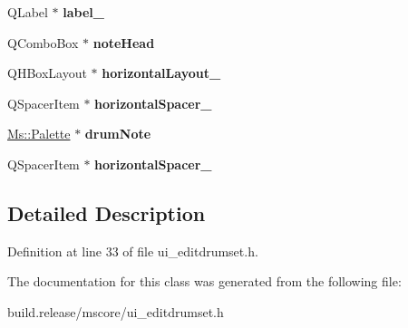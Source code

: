 \begin{DoxyCompactItemize}
Q\+Label $\ast$ {\bfseries label\+\_}
\item 
\mbox{\label{class_ui___edit_drumset_base_a59a7953e60b33395b39d446f1b00ff71}} 
Q\+Combo\+Box $\ast$ {\bfseries note\+Head}
\item 
\mbox{\label{class_ui___edit_drumset_base_aed599bfcfb872bd38e04f70a6fa4d566}} 
Q\+H\+Box\+Layout $\ast$ {\bfseries horizontal\+Layout\+\_}
\item 
\mbox{\label{class_ui___edit_drumset_base_a35d4b35370b5e227d0acd1a9e4b9d49c}} 
Q\+Spacer\+Item $\ast$ {\bfseries horizontal\+Spacer\+\_}
\item 
\mbox{\label{class_ui___edit_drumset_base_a66b7618fae63bfeee0af419d16e3fc77}} 
\hyperlink{class_ms_1_1_palette}{Ms\+::\+Palette} $\ast$ {\bfseries drum\+Note}
\item 
\mbox{\label{class_ui___edit_drumset_base_a45bb3ebbb6111609cc9596576efa91c7}} 
Q\+Spacer\+Item $\ast$ {\bfseries horizontal\+Spacer\+\_}
\end{DoxyCompactItemize}


\subsection{Detailed Description}


Definition at line 33 of file ui\+\_\+editdrumset.\+h.



The documentation for this class was generated from the following file\+:\begin{DoxyCompactItemize}
\item 
build.\+release/mscore/ui\+\_\+editdrumset.\+h\end{DoxyCompactItemize}
